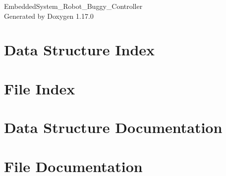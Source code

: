 \documentclass[twoside]{book}
\newcommand{\+}{\discretionary{\mbox{\scriptsize$\hookleftarrow$}}{}{}}
\newcommand{\clearemptydoublepage}{%
    \newpage{\pagestyle{empty}\cleardoublepage}%
  }
\begin{document}
  \raggedbottom
    \hypersetup{pageanchor=false,
                bookmarksnumbered=true,
                pdfencoding=unicode
               }
  \begin{titlepage}
  \vspace*{7cm}
  \begin{center}%
  {\Large Embedded\+System\+\_\+\+Robot\+\_\+\+Buggy\+\_\+\+Controller}\\
  \vspace*{1cm}
  {\large Generated by Doxygen 1.17.0}\\
  \end{center}
  \end{titlepage}
  \clearemptydoublepage
  \tableofcontents
  \clearemptydoublepage
  \hypersetup{pageanchor=true}

\chapter{Data Structure Index}

\chapter{File Index}

\chapter{Data Structure Documentation}











\chapter{File Documentation}



































  \backmatter
  \newpage
  \clearemptydoublepage
  \printindex
\end{document}
